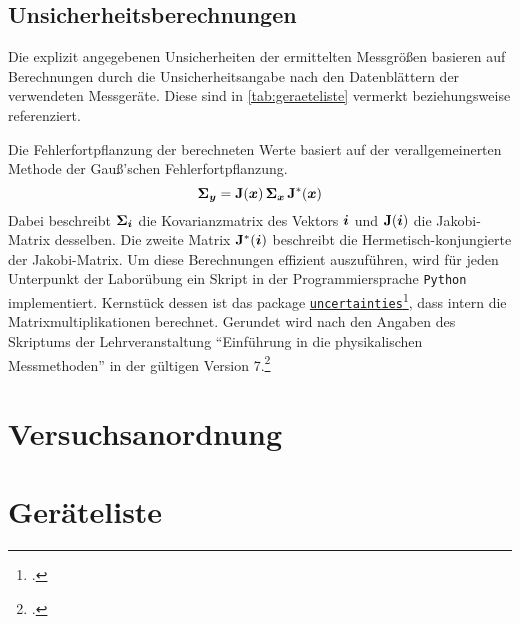 \documentclass[ngerman]{scrartcl}
\begin{document}
\subsection{Unsicherheitsberechnungen}
\label{subsec:unsicherheitsberechnungen}

Die explizit angegebenen Unsicherheiten der ermittelten Messgrößen basieren auf Berechnungen durch die Unsicherheitsangabe nach den Datenblättern der verwendeten Messgeräte. Diese sind in \autoref{tab:geraeteliste} vermerkt beziehungsweise referenziert.

Die Fehlerfortpflanzung der berechneten Werte basiert auf der verallgemeinerten Methode der Gauß'schen Fehlerfortpflanzung.
\[\vb*{\Sigma}_{\vb*{y}} = \vb{J}(\vb*{x}) \, \vb*{\Sigma}_{\vb*{x}} \, \vb{J}^*(\vb*{x})\]
Dabei beschreibt $\displaystyle \vb*{\Sigma}_{\vb*{i}}$ die Kovarianzmatrix des Vektors $\vb*{i}$ und $\vb{J}(\vb*{i})$ die Jakobi-Matrix desselben. Die zweite Matrix $\vb{J}^*(\vb*{i})$ beschreibt die Hermetisch-konjungierte der Jakobi-Matrix. Um diese Berechnungen effizient auszuführen, wird für jeden Unterpunkt der Laborübung ein Skript in der Programmiersprache \texttt{Python} implementiert. Kernstück dessen ist das package \href{https://github.com/lebigot/uncertainties}{\texttt{uncertainties}}\footcite{ref:uncertainties}, dass intern die Matrixmultiplikationen berechnet. Gerundet wird nach den Angaben des Skriptums der Lehrveranstaltung \enquote{Einführung in die physikalischen Messmethoden} in der gültigen Version 7.\footcite{ref:messmethoden}



\section{Versuchsanordnung}
\label{sec:versuchsanordnung}



\section{Geräteliste}
\label{sec:geraeteliste}
\end{document}
